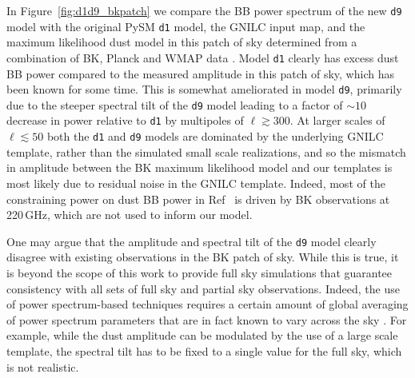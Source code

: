 \documentclass[twocolumn]{aastex631}
\newcommand{\done}{{\tt d1}}
\newcommand{\dnine}{{\tt d9}}
\begin{document}


In Figure~\ref{fig:d1d9_bkpatch} we compare the BB power spectrum of the new \dnine{} model with the original PySM \done{} model, the GNILC input map, and the maximum likelihood dust model in this patch of sky determined from a combination of BK, Planck and WMAP data \citep{Ade:2021}. Model \done{} clearly has excess dust BB power compared to the measured amplitude in this patch of sky, which has been known for some time. This is somewhat ameliorated in model \dnine{}, primarily due to the steeper spectral tilt of the \dnine{} model leading to a factor of $\sim 10$ decrease in power relative to \done{} by multipoles of $\ell \gtrsim 300$. At larger scales of $\ell \lesssim 50$ both the \done{} and \dnine{} models are dominated by the underlying GNILC template, rather than the simulated small scale realizations, and so the mismatch in amplitude between the BK maximum likelihood model and our templates is most likely due to residual noise in the GNILC template. Indeed, most of the constraining power on dust BB power in Ref~\cite{Ade:2021} is driven by BK observations at 220\,GHz, which are not used to inform our model. 

One may argue that the amplitude and spectral tilt of the \dnine{} model clearly disagree with existing observations in the BK patch of sky. While this is true, it is beyond the scope of this work to provide full sky simulations that guarantee consistency with all sets of full sky and partial sky observations. Indeed, the use of power spectrum-based techniques requires a certain amount of global averaging of power spectrum parameters that are in fact known to vary across the sky \cite{planck2016-l04}. For example, while the dust amplitude can be modulated by the use of a large scale template, the spectral tilt has to be fixed to a single value for the full sky, which is not realistic. 
\end{document}
